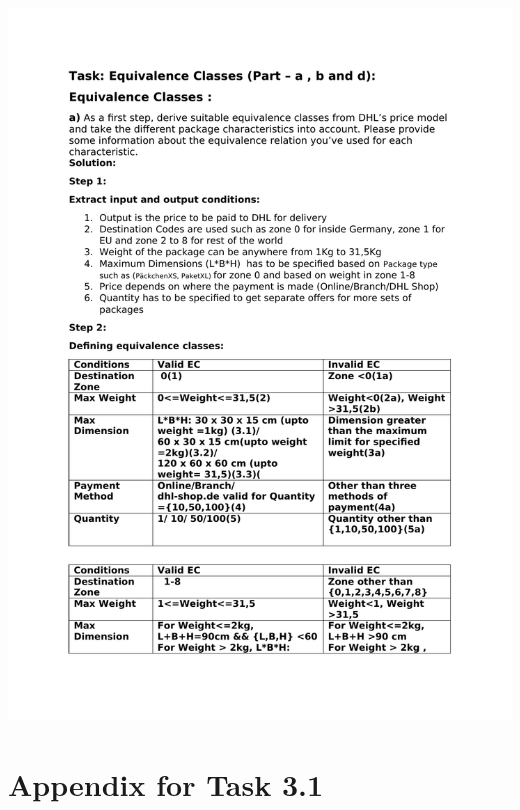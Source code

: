 \documentclass[a4paper,9pt,oneside]{scrreprt}
\begin{document}
	\includegraphics[page=6, clip, trim=1cm 2cm 1cm 2cm, scale=0.90]{others.pdf}
	\clearpage
	
	\section{Appendix for Task 3.1}
	
\end{document}
